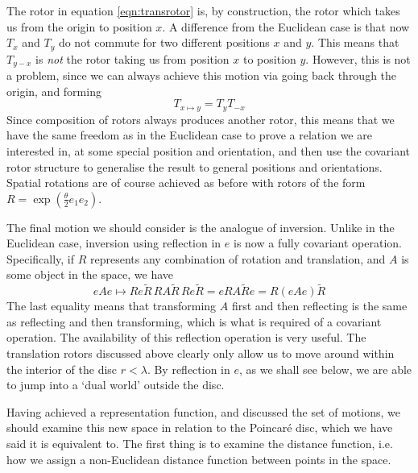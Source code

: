 %
The rotor in equation \ref{eqn:transrotor} is, by construction, the rotor 
which takes us from
the origin to position $x$. A difference from the
Euclidean case is that now $T_x$ and $T_y$ do not commute
for two different positions $x$ and $y$. This means that
$T_{y-x}$ is {\em not\/} the rotor taking us from
position $x$ to position $y$. However, this is not a
problem, since we can always achieve this motion via
going back through the origin, and forming
%
\begin{equation}
T_{x \mapsto y} = T_y T_{-x}
\end{equation}
%
Since composition of rotors always produces another
rotor, this means that we have the same freedom as in the
Euclidean case to prove a relation we are interested in,
at some special position and orientation, and then use
the covariant rotor structure to generalise the result to
general positions and orientations. Spatial rotations are
of course achieved as before with rotors of the form
$R=\exp\left(\frac{\theta}{2}e_1 e_2\right)$.

The final motion we should consider is the analogue of
inversion. Unlike in the Euclidean case, inversion using
reflection in $e$ is now a fully covariant operation.
Specifically, if $R$ represents any combination of
rotation and translation, and $A$ is some object in the
space, we have
%
\begin{equation}
eAe \mapsto Re\tilde{R}\, RA\tilde{R}\, Re\tilde{R} = e
RA\tilde{R} e = R(eAe) \tilde{R}
\end{equation}
%
The last equality means that transforming $A$ first and
then reflecting is the same as reflecting and then
transforming, which is what is required of a covariant
operation. The availability of this reflection operation
is very useful. The translation rotors discussed above
clearly only allow us to move around within the interior
of the disc $r<\lambda$. By reflection in $e$, as we
shall see below, we are able to jump into a `dual world'
outside the disc.

Having achieved a representation function, and discussed
the set of motions, we should examine this new space in
relation to the Poincar\'e disc, which we have said it is
equivalent to. The first thing is to examine the distance
function, i.e. how we assign a non-Euclidean distance
function between points in the space.

